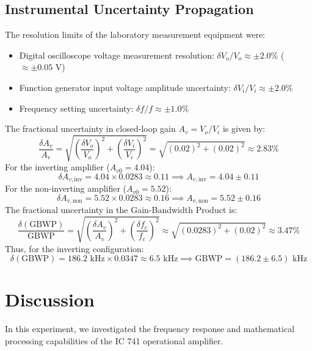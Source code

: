 \documentclass[12pt,a4paper]{article}
\begin{document}
\subsection{Instrumental Uncertainty Propagation}
The resolution limits of the laboratory measurement equipment were:
\begin{itemize}
    \item Digital oscilloscope voltage measurement resolution: $\delta V_o / V_o \approx \pm 2.0\%$ ($\approx \pm 0.05\text{ V}$)
    \item Function generator input voltage amplitude uncertainty: $\delta V_i / V_i \approx \pm 2.0\%$
    \item Frequency setting uncertainty: $\delta f / f \approx \pm 1.0\%$
\end{itemize}
The fractional uncertainty in closed-loop gain $A_v = V_o / V_i$ is given by:
\begin{equation}
    \frac{\delta A_v}{A_v} = \sqrt{\left(\frac{\delta V_o}{V_o}\right)^2 + \left(\frac{\delta V_i}{V_i}\right)^2} = \sqrt{(0.02)^2 + (0.02)^2} \approx 2.83\%
\end{equation}
For the inverting amplifier ($A_{v0} = 4.04$):
\begin{equation}
    \delta A_{v,\text{inv}} = 4.04 \times 0.0283 \approx 0.11 \implies A_{v,\text{inv}} = 4.04 \pm 0.11
\end{equation}
For the non-inverting amplifier ($A_{v0} = 5.52$):
\begin{equation}
    \delta A_{v,\text{non}} = 5.52 \times 0.0283 \approx 0.16 \implies A_{v,\text{non}} = 5.52 \pm 0.16
\end{equation}
The fractional uncertainty in the Gain-Bandwidth Product is:
\begin{equation}
    \frac{\delta (\text{GBWP})}{\text{GBWP}} = \sqrt{\left(\frac{\delta A_v}{A_v}\right)^2 + \left(\frac{\delta f_c}{f_c}\right)^2} \approx \sqrt{(0.0283)^2 + (0.02)^2} \approx 3.47\%
\end{equation}
Thus, for the inverting configuration:
\begin{equation}
    \delta (\text{GBWP}) = 186.2\text{ kHz} \times 0.0347 \approx 6.5\text{ kHz} \implies \text{GBWP} = (186.2 \pm 6.5)\text{ kHz}
\end{equation}

\section{Discussion}
In this experiment, we investigated the frequency response and mathematical processing capabilities of the IC 741 operational amplifier. 
\end{document}
